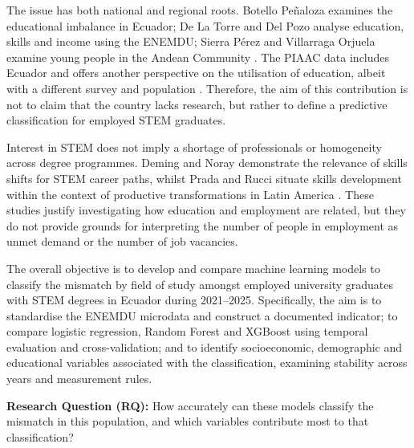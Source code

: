 The issue has both national and regional roots. Botello Peñaloza examines the educational imbalance in Ecuador; De La Torre and Del Pozo analyse education, skills and income using the ENEMDU; Sierra Pérez and Villarraga Orjuela examine young people in the Andean Community \cite{BotelloPealoza2016,DeLaTorreB2025,SierraPrez2024}. The PIAAC data includes Ecuador and offers another perspective on the utilisation of education, albeit with a different survey and population \cite{OECD2019,OECD2023}. Therefore, the aim of this contribution is not to claim that the country lacks research, but rather to define a predictive classification for employed STEM graduates.

Interest in STEM does not imply a shortage of professionals or homogeneity across degree programmes. Deming and Noray demonstrate the relevance of skills shifts for STEM career paths, whilst Prada and Rucci situate skills development within the context of productive transformations in Latin America \cite{Deming2020,PradaRucci2025}. These studies justify investigating how education and employment are related, but they do not provide grounds for interpreting the number of people in employment as unmet demand or the number of job vacancies. 

The overall objective is to develop and compare machine learning models to classify the mismatch by field of study amongst employed university graduates with STEM degrees in Ecuador during 2021--2025. Specifically, the aim is to standardise the ENEMDU microdata and construct a documented indicator; to compare logistic regression, Random Forest and XGBoost using temporal evaluation and cross-validation; and to identify socioeconomic, demographic and educational variables associated with the classification, examining stability across years and measurement rules.

\noindent\textbf{Research Question (RQ):} How accurately can these models classify the mismatch in this population, and which variables contribute most to that classification?